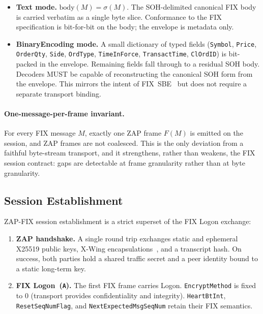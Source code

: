 \documentclass[11pt,a4paper]{article}
\begin{document}
\begin{itemize}
  \item \textbf{Text mode.} $\mathrm{body}(M) = \sigma(M)$. The
        SOH-delimited canonical FIX body is carried verbatim as a
        single byte slice. Conformance to the FIX specification is
        bit-for-bit on the body; the envelope is metadata only.
  \item \textbf{BinaryEncoding mode.} A small dictionary of typed
        fields (\texttt{Symbol}, \texttt{Price}, \texttt{OrderQty},
        \texttt{Side}, \texttt{OrdType}, \texttt{TimeInForce},
        \texttt{TransactTime}, \texttt{ClOrdID}) is bit-packed in
        the envelope. Remaining fields fall through to a residual
        SOH body. Decoders MUST be capable of reconstructing the
        canonical SOH form from the envelope. This mirrors the
        intent of FIX~SBE~\cite{fixsbe} but does not require a
        separate transport binding.
\end{itemize}

\paragraph{One-message-per-frame invariant.}
For every FIX message $M$, exactly one ZAP frame $F(M)$ is emitted on
the session, and ZAP frames are not coalesced. This is the only
deviation from a faithful byte-stream transport, and it strengthens,
rather than weakens, the FIX session contract: gaps are detectable at
frame granularity rather than at byte granularity.

\subsection{Session Establishment}

ZAP-FIX session establishment is a strict superset of the FIX Logon
exchange:

\begin{enumerate}
  \item \textbf{ZAP handshake.} A single round trip exchanges static
        and ephemeral X25519 public keys, X-Wing
        encapsulations~\cite{xwing,kyber}, and a transcript hash. On
        success, both parties hold a shared traffic secret and a
        peer identity bound to a static long-term key.
  \item \textbf{FIX Logon~(\texttt{A}).} The first FIX frame
        carries Logon. \texttt{EncryptMethod} is fixed to $0$
        (transport provides confidentiality and integrity).
        \texttt{HeartBtInt}, \texttt{ResetSeqNumFlag}, and
        \texttt{NextExpectedMsgSeqNum} retain their FIX semantics.
\end{enumerate}
\end{document}
